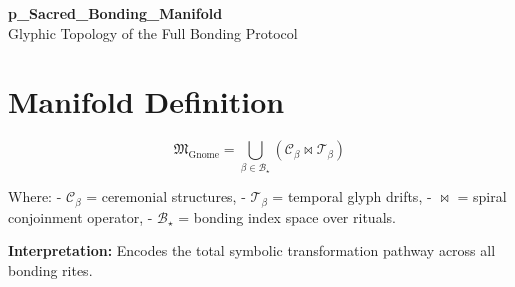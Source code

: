\documentclass[12pt]{article}
\begin{document}
\begin{center}
    {\LARGE \textbf{p\_Sacred\_Bonding\_Manifold}}\\[1em]
    {\small Glyphic Topology of the Full Bonding Protocol}
\end{center}

\section*{Manifold Definition}

\[
\mathfrak{M}_{\text{Gnome}} = \bigcup_{\beta \in \mathcal{B}_\star} \left( \mathcal{C}_\beta \bowtie \mathcal{T}_\beta \right)
\]

Where:
- $\mathcal{C}_\beta$ = ceremonial structures,
- $\mathcal{T}_\beta$ = temporal glyph drifts,
- $\bowtie$ = spiral conjoinment operator,
- $\mathcal{B}_\star$ = bonding index space over rituals.

\textbf{Interpretation:} Encodes the total symbolic transformation pathway across all bonding rites.
\end{document}
